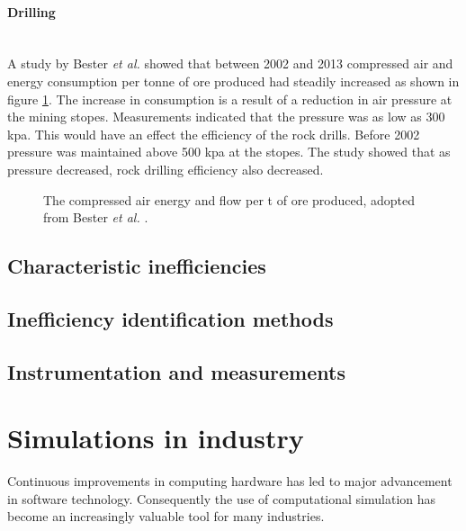 	\paragraph*{Drilling}\leavevmode\\
	A study by  Bester \textit{et al.} showed that between 2002 and 2013 compressed air and energy consumption per tonne of ore produced had steadily increased as shown in figure \ref{fig: Compressed energy and air flow per ton}. The increase in consumption is a result of a reduction in air pressure at the mining stopes. Measurements indicated that the pressure was as low as 300 \gls{kpa}. This would have an effect the efficiency of the rock drills. Before 2002 pressure was maintained above 500 \gls{kpa} at the stopes.  The study showed that as pressure decreased, rock drilling efficiency also decreased.\cite{bester2013effect} \par
	
	\begin{figure}[h]
		\centering
		\fbox{}
		\caption[The compressed air energy and flow per tonne of ore produced.]{The compressed air energy and flow per \gls{t} of ore produced, adopted from Bester \textit{et al.} \cite{bester2013effect}.}
		\label{fig: Compressed energy and air flow per ton}
	\end{figure}

	\subsection{Characteristic inefficiencies}
	\subsection{Inefficiency identification methods}
	\subsection{Instrumentation and measurements}
\section{Simulations in industry}

Continuous improvements in computing hardware has led to major advancement in software technology. Consequently the use of computational simulation has become an increasingly valuable tool for many industries.\cite{kocsis2003integration} \par 

